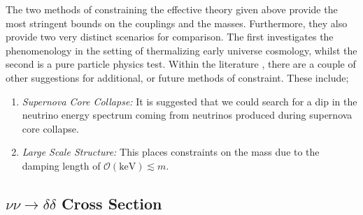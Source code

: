 \documentclass[11pt]{article}
\numberwithin{equation}{section}
\numberwithin{figure}{section}
\numberwithin{table}{section}
\newcommand{\mO}{\mathcal{O}}
\begin{document}
The two methods of constraining the effective theory given above provide the most stringent bounds on the couplings and the masses. Furthermore, they also provide two very distinct scenarios for comparison. The first investigates the phenomenology in the setting of thermalizing early universe cosmology, whilst the second is a pure particle physics test. Within the literature \cite{Farzan2010, Boehm2006}, there are a couple of other suggestions for additional, or future methods of constraint. These include;
\begin{enumerate}
  \item \textit{Supernova Core Collapse:} It is suggested \cite{Franarin2018, Farzan2010} that we could search for a dip in the neutrino energy spectrum coming from neutrinos produced during supernova core collapse.
  \item \textit{Large Scale Structure:} This places constraints on the mass \cite{Boehm2004} due to the damping length of $\mO(\text{keV}) \lesssim m$.
\end{enumerate}




\subsection{$\nu\nu \rightarrow \delta\delta$ Cross Section}\label{sec:crosssection}
\end{document}
